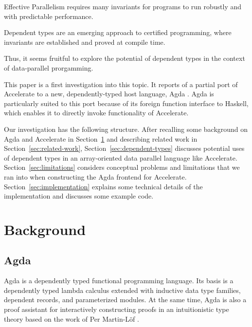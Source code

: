 \documentclass{llncs}
\begin{document}
Effective Parallelism requires many invariants for programs to
run robustly and with predictable performance.

Dependent types are an emerging approach to certified programming,
where invariants are established and proved at compile time.

Thus, it seems fruitful to explore the potential of dependent types in
the context of data-parallel prorgamming.

This paper is a first investigation into this topic. It reports of a
partial port of Accelerate to a new, dependently-typed host language,
Agda \cite{Norell2008,BoveDybjerNorell2009}. Agda is particularly
suited to this port because of its foreign function interface to
Haskell, which enables it to directly invoke functionality of
Accelerate. 

Our investigation has the following structure. After recalling some
background on Agda and Accelerate in Section~\ref{sec:background} and
describing related work in Section~\ref{sec:related-work}, 
Section~\ref{sec:dependent-types} discusses potential uses of
dependent types in an array-oriented data parallel language like
Accelerate. Section~\ref{sec:limitations} considers conceptual
problems and limitations that we ran into when constructing the Agda
frontend for Accelerate. Section~\ref{sec:implementation} explains
some technical details of the implementation and discusses some
example code. 

\section{Background}
\label{sec:background}

\subsection{Agda}
\label{sec:agda}

Agda \cite{Norell2008,BoveDybjerNorell2009} is a dependently typed
functional programming language. Its basis is a dependently typed
lambda calculus extended with inductive data type families, dependent
records, and parameterized modules. At the same time, Agda is also a
proof assistant for interactively constructing proofs in an
intuitionistic type theory based on the work of Per Martin-L\"of
\cite{MartinLoef1984}. 
\end{document}
